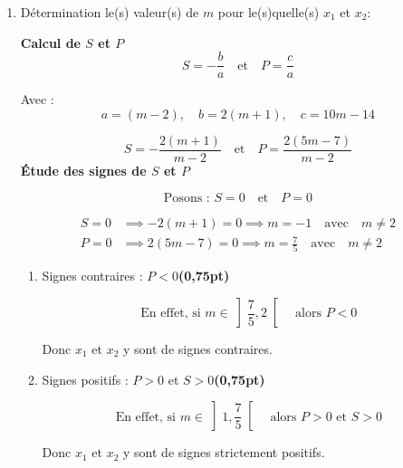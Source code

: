 \documentclass[12pt,a4paper]{article}
\begin{document}
\begin{enumerate}
\begin{itemize}
\textbf{Discussion selon les valeurs de \(m\)}

\begin{itemize}
    \item[•] Si \(m \in \left]-\infty, 1\right[ \cup \left]3, +\infty\right[\), alors \(\Delta_m < 0\), donc \(\mathcal{S}_\mathbb{R} = \emptyset\).
    
    \item[•] Si \(m \in \left]1, 3\right[\setminus\{2\}\), alors \(\Delta_m' > 0\), donc \((E_m)\) admet deux solutions distinctes.
    
    \item[•] Si \(m = 1\) ou \(m = 3\), alors \(\Delta_m' = 0\) donc \((E_m)\) admet une solution double.
\end{itemize}
\end{itemize}

\item Détermination le(s) valeur(s) de \(m\) pour le(s)quelle(s) \(x_{1}\) et \(x_{2}\):

\textbf{Calcul de \(S\) et \(P\)}
\[
S = -\frac{b}{a} \quad \text{et} \quad P = \frac{c}{a}
\]

Avec :
\[
a = (m-2), \quad b = 2(m+1), \quad c = 10m - 14
\]

\[
S = -\frac{2(m+1)}{m-2} \quad \text{et} \quad P = \frac{2(5m-7)}{m-2}
\]
\textbf{Étude des signes de \(S\) et \(P\)}

\[
\text{Posons : } S = 0 \quad \text{et} \quad P = 0
\]

\[
\begin{aligned}
S = 0 & \implies -2(m+1) = 0 \implies m = -1 \quad \text{avec} \quad m \neq 2 \\
P = 0 & \implies 2(5m-7) = 0 \implies m = \frac{7}{5} \quad \text{avec} \quad m \neq 2
\end{aligned}
\] 
\begin{enumerate}
\item Signes contraires : \(P < 0\)\hfill \textbf{(0,75pt)}

\[
\text{En effet, si } m \in\left]\frac{7}{5}, 2\right[ \quad \text{alors } P < 0
\]

Donc \(x_1\) et \(x_2\) y sont de signes contraires.

\item Signes positifs : \(P > 0\) et \(S > 0\)\hfill \textbf{(0,75pt)}

\[
\text{En effet, si } m \in \left]1, \frac{7}{5}\right[ \quad \text{alors } P > 0 \text{ et } S > 0
\]

Donc \(x_1\) et \(x_2\) y  sont de signes strictement positifs.
\end{enumerate}
\end{enumerate}
\end{document}
